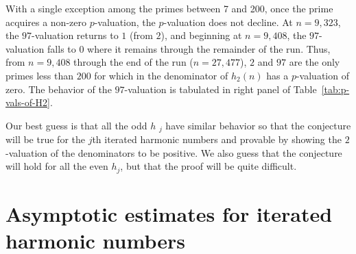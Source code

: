 \documentclass{article}
\begin{document}


With a single exception among the primes between 7 and 200, once the prime
acquires a non-zero $p$-valuation, the $p$-valuation does not decline. At $%
n=9,323$, the $97$-valuation returns to $1$ (from $2$), and beginning at $%
n=9,408$, the $97$-valuation falls to 0 where it remains through the
remainder of the run. Thus, from $n=9,408$ through the end of the run ($%
n=27,477$), $2$ and $97$ are the only primes less than $200$ for which in the
denominator of $h_{2}\left( n\right) $ has a $p$-valuation of zero. The
behavior of the $97$-valuation is tabulated in right panel of Table~\ref{tab:p-vals-of-H2}.

Our best guess is that all the odd $h$ $_{j}$ have similar behavior so that
the conjecture will be true for the $j$th iterated harmonic numbers and
provable by showing the $2$-valuation of the denominators to be positive. We
also guess that the conjecture will hold for all the even $h_{j}$, but that
the proof will be quite difficult.

\section{Asymptotic estimates for iterated harmonic numbers}
\end{document}
